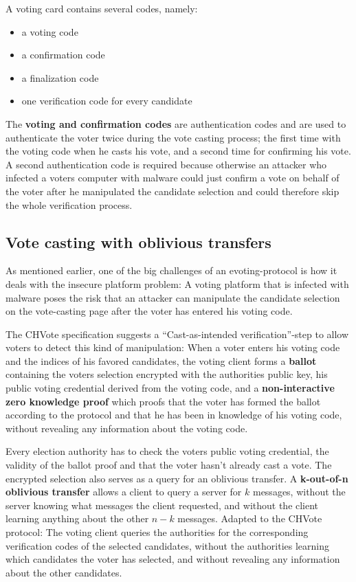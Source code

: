 A voting card contains several codes, namely:

\begin{itemize}
	\item a voting code
	\item a confirmation code
	\item a finalization code
	\item one verification code for every candidate
\end{itemize}

The \textbf{voting and confirmation codes} are authentication codes and are used to authenticate the voter twice during the vote casting process; the first time with the voting code when he casts his vote, and a second time for confirming his vote. A second authentication code is required because otherwise an attacker who infected a voters computer with malware could just confirm a vote on behalf of the voter after he manipulated the candidate selection and could therefore skip the whole verification process.

\subsection{Vote casting with oblivious transfers}
As mentioned earlier, one of the big challenges of an evoting-protocol is how it deals with the insecure platform problem: A voting platform that is infected with malware poses the risk that an attacker can manipulate the candidate selection on the vote-casting page after the voter has entered his voting code. 

The CHVote specification suggests a "`Cast-as-intended verification"'-step to allow voters to detect this kind of manipulation: When a voter enters his voting code and the indices of his favored candidates, the voting client forms a \textbf{ballot} containing the voters selection encrypted with the authorities public key, his public voting credential derived from the voting code, and a \textbf{non-interactive zero knowledge proof} which proofs that the voter has formed the ballot according to the protocol and that he has been in knowledge of his voting code, without revealing any information about the voting code.

Every election authority has to check the voters public voting credential, the validity of the ballot proof and that the voter hasn't already cast a vote. The encrypted selection also serves as a query for an oblivious transfer. A \textbf{k-out-of-n oblivious transfer} allows a client to query a server for $k$ messages, without the server knowing what messages the client requested, and without the client learning anything about the other $n-k$ messages. Adapted to the CHVote protocol: The voting client queries the authorities for the corresponding verification codes of the selected candidates, without the authorities learning which candidates the voter has selected, and without revealing any information about the other candidates. 


